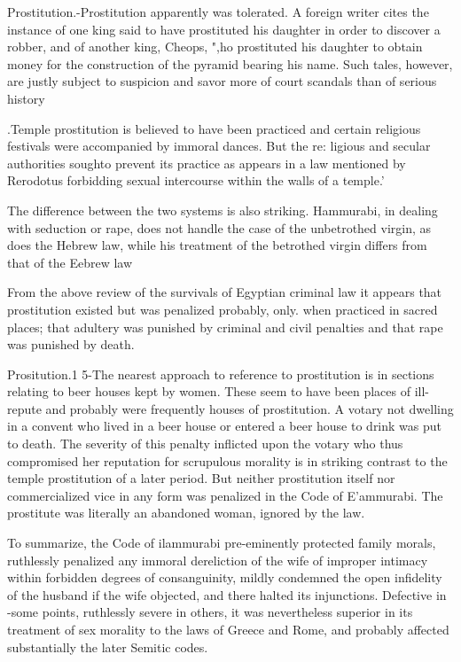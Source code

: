 \documentclass[11pt]{article}
\begin{document}
{Prostitution.-Prostitution apparently was tolerated. A foreign
writer cites the instance of one king said to have prostituted his daughter in order to discover a robber, and of another king, Cheops, ",ho prostituted his daughter to obtain money for the construction of the
pyramid bearing his name. Such tales, however, are justly subject to
suspicion and savor more of court scandals than of serious history

.Temple prostitution is believed to have been practiced and certain
religious festivals were accompanied by immoral dances. But the re:
ligious and secular authorities soughto prevent its practice as appears
in a law mentioned by Rerodotus forbidding sexual intercourse within
the walls of a temple.' 



The difference between the two systems is also striking. Hammurabi, in dealing with seduction or rape, does not handle the case of
the unbetrothed virgin, as does the Hebrew law, while his treatment of
the betrothed virgin differs from that of the Eebrew law

From the above review of the survivals of Egyptian criminal law
it appears that prostitution existed but was penalized probably, only.
when practiced in sacred places; that adultery was punished by criminal
and civil penalties and that rape was punished by death.

Prositution.1 5-The nearest approach to reference to prostitution is
in sections relating to beer houses kept by women. These seem to have been
places of ill-repute and probably were frequently houses of prostitution. A votary not dwelling in a convent who lived in a beer house or
entered a beer house to drink was put to death. The severity of this
penalty inflicted upon the votary who thus compromised her reputation for scrupulous morality is in striking contrast to the temple prostitution of a later period. But neither prostitution itself nor commercialized vice in any form was penalized in the Code of E'ammurabi.
The prostitute was literally an abandoned woman, ignored by the law.

To summarize, the Code of ilammurabi pre-eminently protected
family morals, ruthlessly penalized any immoral dereliction of the wife
of improper intimacy within forbidden degrees of consanguinity, mildly
condemned the open infidelity of the husband if the wife objected, and
there halted its injunctions. Defective in -some points, ruthlessly severe
in others, it was nevertheless superior in its treatment of sex morality
to the laws of Greece and Rome, and probably affected substantially the
later Semitic codes.


}
\end{document}
